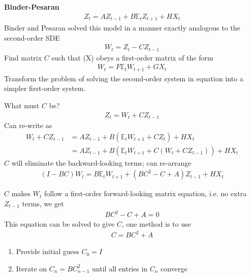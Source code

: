 \documentclass{beamer}
\begin{document}
\begin{frame}
  \textbf{Binder-Pesaran}  
  \begin{align}  
  Z_t=AZ_{t-1} + B\mathbb{E}_t Z_{t+1} + HX_t 
  \end{align}
  Binder and Pesaran solved this model in a manner exactly analogous to the second-order SDE 
  \begin{align}
   W_t=Z_t - CZ_{t-1}  
   \end{align}
   Find matrix $C$ such that (X) obeys a first-order matrix of the form 
   \begin{align}
    W_t=F\mathbb{E}_t W_{t+1} + GX_t  
    \end{align}
    Transform the problem of solving the second-order system in equation into a simpler first-order system.
\end{frame}

\begin{frame} 
 What must $C$ be?
 \begin{align}
   Z_t=W_t + CZ_{t-1}
 \end{align}
 Can re-write as 
 \begin{align}
  W_t + CZ_{t-1} &= AZ_{t-1} + B(\mathbb{E}_t W_{t+1} + CZ_t) + HX_t\\ \nonumber
  &= AZ_{t-1} + B(\mathbb{E}_t W_{t+1} + C(W_t+CZ_{t-1})) + HX_t  
  \end{align}
  $C$ will eliminate the backward-looking terms; can re-arrange
  \begin{align}
    (I-BC)W_t = B\mathbb{E}_t W_{t+1} + (BC^2-C+A)Z_{t-1} + HX_t  
  \end{align}
\end{frame}

\begin{frame}
  $C$ makes $W_t$ follow a first-order forward-looking matrix equation, i.e. no extra $Z_{t-1}$ terms, we get
\begin{align}
  BC^2-C+A=0
\end{align}
This equation can be solved to give $C$, one method is to use
\begin{align}
  C=BC^2+A
\end{align}
\begin{enumerate}
  \item Provide initial guess $C_0=I$
  \item Iterate on $C_n=BC^2_{n-1}$ until all entries in $C_n$ converge
\end{enumerate}  
\end{frame}
\end{document}
